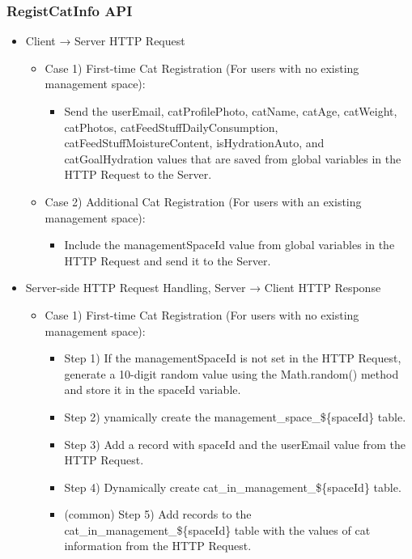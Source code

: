 \documentclass[conference]{IEEEtran}
\begin{document}
\subsubsection{RegistCatInfo API}
\begin{itemize}
    \item Client → Server HTTP Request
    \begin{itemize}
        \item Case 1) First-time Cat Registration (For users with no existing management space):
        \begin{itemize}
            \item Send the userEmail, catProfilePhoto, catName, catAge, catWeight, catPhotos, catFeedStuffDailyConsumption, catFeedStuffMoistureContent, isHydrationAuto, and catGoalHydration values that are saved from global variables in the HTTP Request to the Server.
        \end{itemize}
        \item Case 2) Additional Cat Registration (For users with an existing management space):
        \begin{itemize}
            \item Include the managementSpaceId value from global variables in the HTTP Request and send it to the Server.
            \\
        \end{itemize}
    \end{itemize}
    \item Server-side HTTP Request Handling, Server → Client HTTP Response
    \begin{itemize}
        \item Case 1) First-time Cat Registration (For users with no existing management space):
        \begin{itemize}
            \item Step 1) If the managementSpaceId is not set in the HTTP Request, generate a 10-digit random value using the Math.random() method and store it in the spaceId variable.
            \item Step 2) ynamically create the management\_space\_\$\{spaceId\} table.
            \item Step 3) Add a record with spaceId and the userEmail value from the HTTP Request.
            \item Step 4) Dynamically create cat\_in\_management\_\$\{spaceId\} table.
            \item (common) Step 5) Add records to the cat\_in\_management\_\$\{spaceId\} table with the values of cat information from the HTTP Request.

\end{itemize}
\end{itemize}
\end{itemize}
\end{document}
